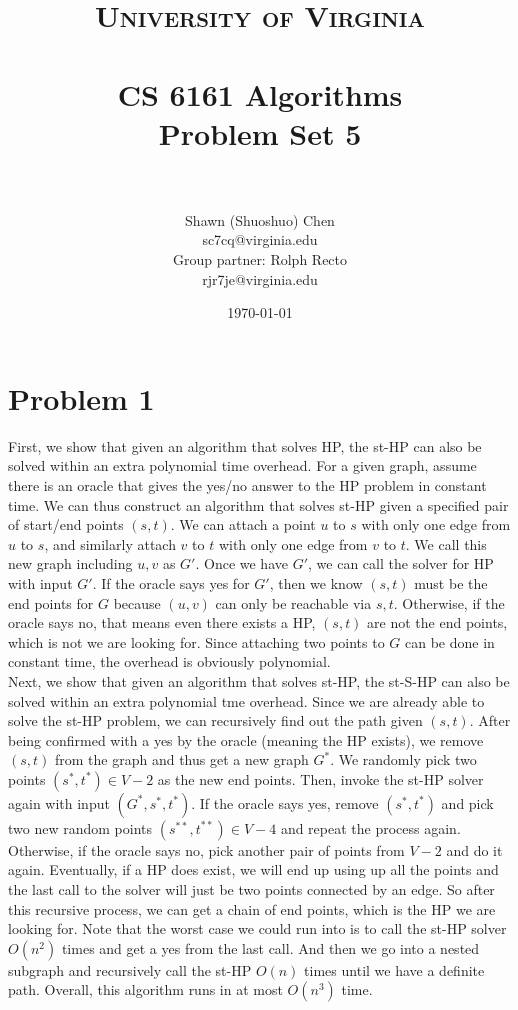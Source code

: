 \documentclass[titlepage, paper=a4, fontsize=11pt]{scrartcl} %
\title{	
\normalfont \normalsize 
\textsc{University of Virginia} \\ [25pt] %
\horrule{0.5pt} \\[0.4cm] %
\huge CS 6161 Algorithms \\
\huge Problem Set 5 \\ %
\horrule{2pt} \\[0.5cm] %
}
\author{Shawn (Shuoshuo) Chen\\sc7cq@virginia.edu\\Group partner: Rolph Recto\\ rjr7je@virginia.edu}
\date{\normalsize\today} %
\numberwithin{equation}{section} %
\numberwithin{figure}{section} %
\numberwithin{table}{section} %
\numberwithin{figure}{section}
\begin{document}
\maketitle %


\section*{Problem 1}
First, we show that given an algorithm that solves HP, the st-HP can also be solved within an extra polynomial time overhead. For a given graph, assume there is an oracle that gives the yes/no answer to the HP problem in constant time. We can thus construct an algorithm that solves st-HP given a specified pair of start/end points $(s,t)$. We can attach a point $u$ to $s$ with only one edge from $u$ to $s$, and similarly attach $v$ to $t$ with only one edge from $v$ to $t$. We call this new graph including $u,v$ as $G'$. Once we have $G'$, we can call the solver for HP with input $G'$. If the oracle says yes for $G'$, then we know $(s,t)$ must be the end points for $G$ because $(u,v)$ can only be reachable via $s,t$. Otherwise, if the oracle says no, that means even there exists a HP, $(s,t)$ are not the end points, which is not we are looking for. Since attaching two points to $G$ can be done in constant time, the overhead is obviously polynomial. \\

Next, we show that given an algorithm that solves st-HP, the st-S-HP can also be solved within an extra polynomial tme overhead. Since we are already able to solve the st-HP problem, we can recursively find out the path given $(s,t)$. After being confirmed with a yes by the oracle (meaning the HP exists), we remove $(s,t)$ from the graph and thus get a new graph $G^*$. We randomly pick two points $(s^*,t^*) \in V-2$ as the new end points. Then, invoke the st-HP solver again with input $(G^*,s^*,t^*)$. If the oracle says yes, remove $(s^*,t^*)$ and pick two new random points $(s^{**},t^{**}) \in V-4$ and repeat the process again. Otherwise, if the oracle says no, pick another pair of points from $V-2$ and do it again. Eventually, if a HP does exist, we will end up using up all the points and the last call to the solver will just be two points connected by an edge. So after this recursive process, we can get a chain of end points, which is the HP we are looking for. Note that the worst case we could run into is to call the st-HP solver $O(n^2)$ times and get a yes from the last call. And then we go into a nested subgraph and recursively call the st-HP $O(n)$ times until we have a definite path. Overall, this algorithm runs in at most $O(n^3)$ time. \\
\end{document}
